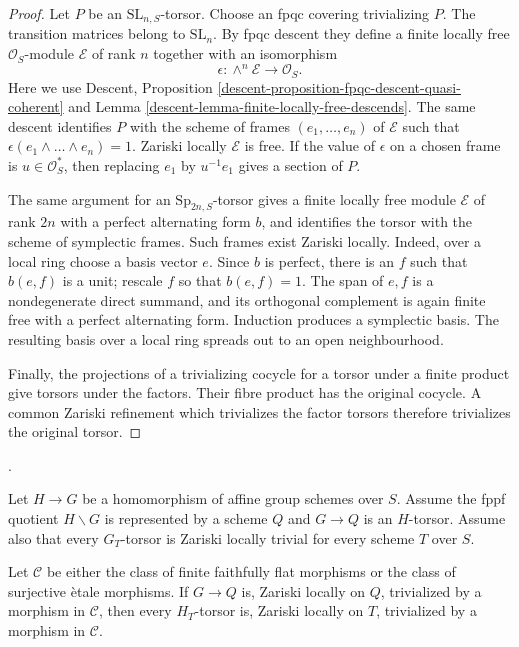 \begin{proof}
Let $P$ be an $\text{SL}_{n, S}$-torsor. Choose an fpqc covering
trivializing $P$. The transition matrices belong to $\text{SL}_n$.
By fpqc descent they define a finite locally free $\mathcal{O}_S$-module
$\mathcal{E}$ of rank $n$ together with an isomorphism
$$
\epsilon : \wedge^n\mathcal{E} \longrightarrow \mathcal{O}_S.
$$
Here we use Descent, Proposition
\ref{descent-proposition-fpqc-descent-quasi-coherent} and Lemma
\ref{descent-lemma-finite-locally-free-descends}. The same descent
identifies $P$ with the scheme of frames $(e_1, \ldots, e_n)$ of
$\mathcal{E}$ such that
$\epsilon(e_1 \wedge \ldots \wedge e_n) = 1$. Zariski locally
$\mathcal{E}$ is free. If the value of $\epsilon$ on a chosen frame is
$u \in \mathcal{O}_S^*$, then replacing $e_1$ by $u^{-1}e_1$ gives a
section of $P$.

The same argument for an $\text{Sp}_{2n, S}$-torsor gives a finite locally
free module $\mathcal{E}$ of rank $2n$ with a perfect alternating form
$b$, and identifies the torsor with the scheme of symplectic frames.
Such frames exist Zariski locally. Indeed, over a local ring choose a
basis vector $e$. Since $b$ is perfect, there is an $f$ such that
$b(e, f)$ is a unit; rescale $f$ so that $b(e, f) = 1$. The span of
$e, f$ is a nondegenerate direct summand, and its orthogonal complement
is again finite free with a perfect alternating form. Induction produces
a symplectic basis. The resulting basis over a local ring spreads out to
an open neighbourhood.

Finally, the projections of a trivializing cocycle for a torsor under a
finite product give torsors under the factors. Their fibre product has the
original cocycle. A common Zariski refinement which trivializes the factor
torsors therefore trivializes the original torsor.
\end{proof}

\begin{lemma}
\label{lemma-subgroup-torsor-local-triviality}
\begin{reference}
\cite[Expos\'e 190, discussion following Proposition 6.1, p. 326]{FGA}.
\end{reference}
Let $H \to G$ be a homomorphism of affine group schemes over $S$. Assume
the fppf quotient $H \backslash G$ is represented by a scheme $Q$ and
$G \to Q$ is an $H$-torsor. Assume also that every $G_T$-torsor is
Zariski locally trivial for every scheme $T$ over $S$.

Let $\mathcal{C}$ be either the class of finite faithfully flat morphisms
or the class of surjective \`etale morphisms. If $G \to Q$ is, Zariski
locally on $Q$, trivialized by a morphism in $\mathcal{C}$, then every
$H_T$-torsor is, Zariski locally on $T$, trivialized by a morphism in
$\mathcal{C}$.
\end{lemma}

